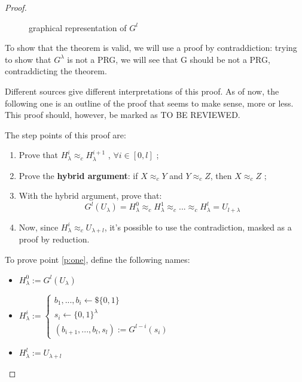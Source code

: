 \begin{proof}
\begin{figure}[h!]
        \caption{graphical representation of $G^{l}$}
        \label{fig:gpowerl}
    \end{figure}

    To show that the theorem is valid, we will use a proof by contraddiction: trying to show that $G^{\lambda}$ is not a PRG, we will see that G should be not a PRG, contraddicting the theorem.

    Different sources give different interpretations of this proof. As of now, the following one is an outline of the proof that seems to make sense, more or less. This proof should, however, be marked as TO BE REVIEWED.

    The step points of this proof are:
    \begin{enumerate}
        \item \label{p:one} Prove that $H_{\lambda}^{i} \approx_{c} H_{\lambda}^{i+1}$ , $ \forall i \in [0,l]$ ;
        \item \label{p:two} Prove the \textbf{hybrid argument}: if $X \approx_{c} Y$ and $Y \approx_{c} Z$, then $X \approx_{c} Z$ ;
        \item \label{p:three} With the hybrid argument, prove that:
            \[
                G^{l}(U_{\lambda})= H_{\lambda}^{0} \approx_{c} 
                H_{\lambda}^{1} \approx_{c} ... \approx_{c} 
                H_{\lambda}^{l} = U_{l+\lambda}
            \] 
        \item \label{p:four} Now, since $H_{\lambda}^{i} \approx_{c} U_{\lambda + l}$, it's possible to use the contradiction, masked as a proof by reduction.
    \end{enumerate}

    To prove point \ref{p:one}, define the following names:
    \begin{itemize}
        \item $H_{\lambda}^{0} := G^{l}(U_{\lambda})$
        \item $H_{\lambda}^{i}:=
            \begin{cases}
                b_1 , ..., b_{i} \leftarrow\$ \{0,1\} \\
                s_{i} \leftarrow \{0,1\}^{\lambda} \\
                (b_{i+1}, ..., b_{l}, s_{l}) := G^{l-i}(s_{i})
            \end{cases}$
        \item  $H_{\lambda}^{l} := U_{\lambda + l}$
    \end{itemize}


\end{proof}
